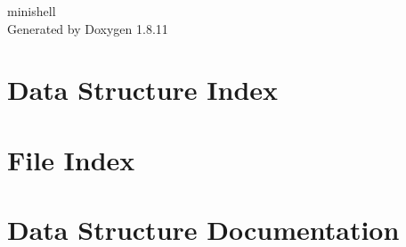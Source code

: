 \documentclass[twoside]{book}
\newcommand{\+}{\discretionary{\mbox{\scriptsize$\hookleftarrow$}}{}{}}
\newcommand{\clearemptydoublepage}{%
  \newpage{\pagestyle{empty}\cleardoublepage}%
}
\begin{document}
\hypersetup{pageanchor=false,
             bookmarksnumbered=true,
             pdfencoding=unicode
            }
\begin{titlepage}
\vspace*{7cm}
\begin{center}%
{\Large minishell }\\
\vspace*{1cm}
{\large Generated by Doxygen 1.8.11}\\
\end{center}
\end{titlepage}
\clearemptydoublepage
\tableofcontents
\clearemptydoublepage
{}
\hypersetup{pageanchor=true}

\chapter{Data Structure Index}

\chapter{File Index}

\chapter{Data Structure Documentation}


\end{document}
